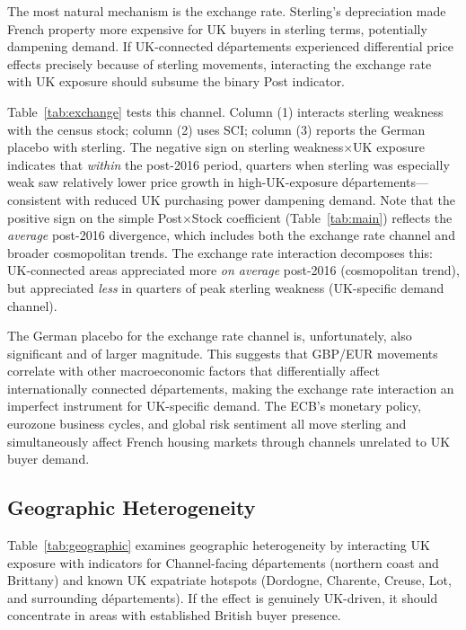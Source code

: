 \documentclass[12pt]{article}
\begin{document}
The most natural mechanism is the exchange rate. Sterling's depreciation made French property more expensive for UK buyers in sterling terms, potentially dampening demand. If UK-connected d\'epartements experienced differential price effects precisely because of sterling movements, interacting the exchange rate with UK exposure should subsume the binary Post indicator.

Table~\ref{tab:exchange} tests this channel. Column (1) interacts sterling weakness with the census stock; column (2) uses SCI; column (3) reports the German placebo with sterling. The negative sign on sterling weakness$\times$UK exposure indicates that \textit{within} the post-2016 period, quarters when sterling was especially weak saw relatively lower price growth in high-UK-exposure d\'epartements---consistent with reduced UK purchasing power dampening demand. Note that the positive sign on the simple Post$\times$Stock coefficient (Table~\ref{tab:main}) reflects the \textit{average} post-2016 divergence, which includes both the exchange rate channel and broader cosmopolitan trends. The exchange rate interaction decomposes this: UK-connected areas appreciated more \textit{on average} post-2016 (cosmopolitan trend), but appreciated \textit{less} in quarters of peak sterling weakness (UK-specific demand channel).

The German placebo for the exchange rate channel is, unfortunately, also significant and of larger magnitude. This suggests that GBP/EUR movements correlate with other macroeconomic factors that differentially affect internationally connected d\'epartements, making the exchange rate interaction an imperfect instrument for UK-specific demand. The ECB's monetary policy, eurozone business cycles, and global risk sentiment all move sterling and simultaneously affect French housing markets through channels unrelated to UK buyer demand.

{\footnotesize}

\subsection{Geographic Heterogeneity}

Table~\ref{tab:geographic} examines geographic heterogeneity by interacting UK exposure with indicators for Channel-facing d\'epartements (northern coast and Brittany) and known UK expatriate hotspots (Dordogne, Charente, Creuse, Lot, and surrounding d\'epartements). If the effect is genuinely UK-driven, it should concentrate in areas with established British buyer presence.
\end{document}
